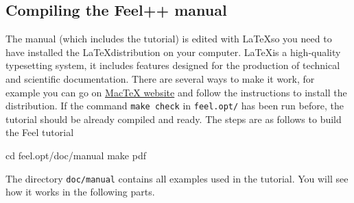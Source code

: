 

\subsection{Compiling the Feel++ manual}
\label{sec:comp-feel-tutor}
The manual (which includes the tutorial) is edited with \LaTeX  so you need to have installed the \LaTeX  distribution on your computer. \LaTeX  is a high-quality typesetting system, it includes features designed for the production of technical and scientific documentation. There are several ways to make it work, for example you can go on \href{http://www.tug.org/mactex/}{MacTeX website} and follow the instructions to install the distribution. If the command \lstinline|make check| in \lstinline|feel.opt/| has been run before, the tutorial
should be already compiled and ready. The steps are as follows to build the Feel tutorial
\begin{unixcom}
  cd feel.opt/doc/manual
  make pdf
\end{unixcom}
%
The directory \lstinline|doc/manual| contains all examples used in the tutorial. You will see how it works in the following parts.


